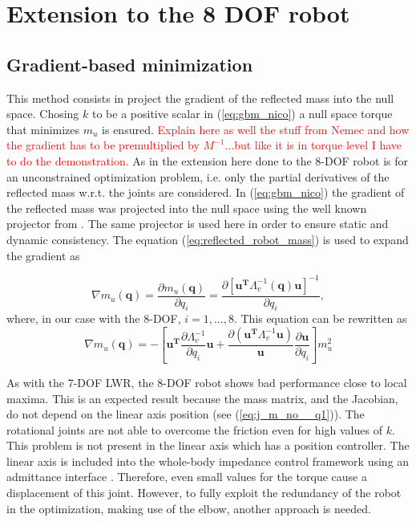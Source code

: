\chapter{Extension to the 8 DOF robot}
\label{ch:extension8dof}





\section{Gradient-based minimization}
\label{sec:Gradientbasedminimization}

This method consists in project the gradient of the reflected mass into the null space. Chosing $k$ to be a positive scalar in (\ref{eq:gbm_nico}) a null space torque that minimizes $m_u$ is ensured. 
\textcolor{red}{Explain here as well the stuff from Nemec and how the gradient has to be premultiplied by $M^{-1}$...but like it is in torque level I have to do the demonstration.} As in  \cite{paper_iros2017} the extension here done to the 8-DOF robot is for an unconstrained optimization problem, i.e. only the partial derivatives of the reflected mass w.r.t. the joints are considered. 
In (\ref{eq:gbm_nico}) the gradient of the reflected mass was projected into the null space using the well known projector from \cite{khatib1995}. The same projector is used here in order to ensure static and dynamic consistency.  The equation (\ref{eq:reflected_robot_mass}) is used to expand the gradient as

\begin{equation}
\nabla m_u(\mathbf{q}) = 
\frac{\partial {m_u(\mathbf{q})}}{\partial {q_i}} = \frac{\partial {[\mathbf{u^T} \Lambda_{v}^{-1}(\mathbf{q}) \mathbf{u}]^{-1}}}{\partial {q_i}}, \label{eq:grad_refl_mass_1}
\end{equation}
where, in our case with the 8-DOF,  $i = 1, \dots, 8$. This equation can be rewritten as
\begin{equation}
\nabla m_u(\mathbf{q}) = - \left [ \mathbf{u^T} \frac{\partial {\Lambda_{v}^{-1}}}{\partial {q_i}} \mathbf{u} +
\frac{\partial {(\mathbf{u^T} \Lambda_{v}^{-1} \mathbf{u})}}{\mathbf{u}} \frac{\partial {\mathbf{u}}}{\partial {q_i}} \right ] m_u^2 \label{eq:grad_refl_mass_2}
\end{equation}




 As with the 7-DOF LWR, the 8-DOF robot shows bad performance close to local maxima. This is an expected result because the mass matrix, and the Jacobian, do not depend on the linear axis position (see (\ref{eq:j_m_no__q1})). The rotational joints are not able to overcome the friction even for high values of $k$. This problem is not present in the linear axis which has a position controller. The linear axis is included into the whole-body impedance control framework using an admittance interface \cite{whole_body_imp}. Therefore, even small values for the torque cause a displacement of this joint. However, to fully exploit the redundancy of the robot  in the optimization, making use of the elbow, another approach is needed. 
 
